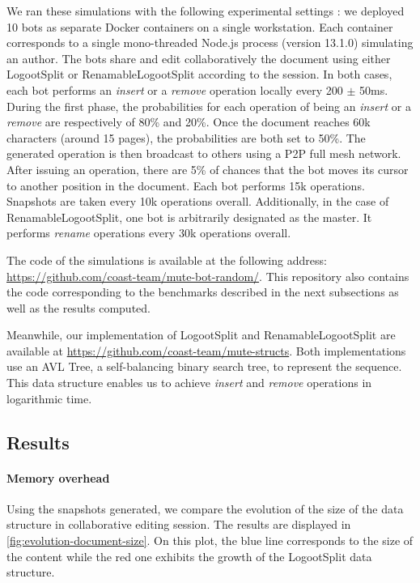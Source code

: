 \documentclass[sigplan,10pt]{acmart}
\begin{document}
We ran these simulations with the following experimental settings : we deployed 10 bots as separate Docker containers on a single workstation.
Each container corresponds to a single mono-threaded Node.js process (version 13.1.0) simulating an author.
The bots share and edit collaboratively the document using either LogootSplit or RenamableLogootSplit according to the session.
In both cases, each bot performs an \emph{insert} or a \emph{remove} operation locally every 200 $\pm$ 50ms.
During the first phase, the probabilities for each operation of being an \emph{insert} or a \emph{remove} are respectively of 80\% and 20\%.
Once the document reaches 60k characters (around 15 pages), the probabilities are both set to 50\%.
The generated operation is then broadcast to others using a \ac{P2P} full mesh network.
After issuing an operation, there are 5\% of chances that the bot moves its cursor to another position in the document.
Each bot performs 15k operations.
Snapshots are taken every 10k operations overall.
Additionally, in the case of RenamableLogootSplit, one bot is arbitrarily designated as the master.
It performs \emph{rename} operations every 30k operations overall.

The code of the simulations is available at the following address: \url{https://github.com/coast-team/mute-bot-random/}.
This repository also contains the code corresponding to the benchmarks described in the next subsections as well as the results computed.

\begin{sloppypar}
Meanwhile, our implementation of LogootSplit and RenamableLogootSplit are available at \url{https://github.com/coast-team/mute-structs}.
Both implementations use an AVL Tree, a self-balancing binary search tree, to represent the sequence.
This data structure enables us to achieve \emph{insert} and \emph{remove} operations in logarithmic time.
\end{sloppypar}

\subsection{Results}

\paragraph{Memory overhead}

Using the snapshots generated, we compare the evolution of the size of the data structure in collaborative editing session.
The results are displayed in \autoref{fig:evolution-document-size}.
On this plot, the blue line corresponds to the size of the content while the red one exhibits the growth of the LogootSplit data structure.
\end{document}
